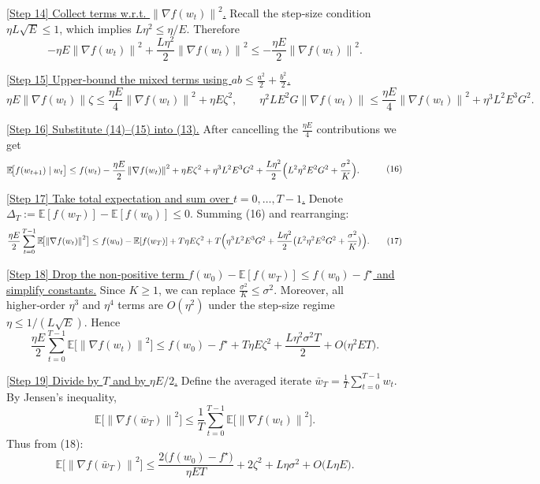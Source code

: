 \documentclass{article}
\newcommand{\E}{\mathbb{E}}
\newcommand{\norm}[1]{\left\|#1\right\|}
\begin{document}
\noindent\underline{[Step 14] Collect terms w.r.t. $\norm{\nabla f(w_t)}^{2}$.}
Recall the step‑size condition $\eta L\sqrt{E}\le 1$, which implies $L\eta^{2}\le \eta/E$. Therefore
\[
-\eta E \norm{\nabla f(w_t)}^{2}+\frac{L\eta^{2}}{2}\norm{\nabla f(w_t)}^{2}
\le -\frac{\eta E}{2}\norm{\nabla f(w_t)}^{2}. \tag{14}
\]

\noindent\underline{[Step 15] Upper‑bound the mixed terms using $ab\le\frac{a^{2}}{2}+ \frac{b^{2}}{2}$.}
\[
\eta E \norm{\nabla f(w_t)}\zeta
   \le \frac{\eta E}{4}\norm{\nabla f(w_t)}^{2}
        +\eta E\zeta^{2},
\qquad
\eta^{2}L E^{2} G\norm{\nabla f(w_t)}
   \le \frac{\eta E}{4}\norm{\nabla f(w_t)}^{2}
        +\eta^{3}L^{2}E^{3}G^{2}. \tag{15}
\]

\noindent\underline{[Step 16] Substitute (14)–(15) into (13).}
After cancelling the $\frac{\eta E}{4}$ contributions we get
\[
\begin{aligned}
\E\!\bigl[f(w_{t+1})\mid w_t\bigr]
&\le f(w_t)
   -\frac{\eta E}{2}\norm{\nabla f(w_t)}^{2}
   +\eta E\zeta^{2}
   +\eta^{3}L^{2}E^{3}G^{2}
   +\frac{L\eta^{2}}{2}\Bigl(L^{2}\eta^{2}E^{2}G^{2}
        +\frac{\sigma^{2}}{K}\Bigr).
\end{aligned}
\tag{16}
\]

\noindent\underline{[Step 17] Take total expectation and sum over $t=0,\dots,T-1$.}
Denote $\Delta_T:=\E[f(w_T)]-\E[f(w_0)]\le 0$.
Summing (16) and rearranging:
\[
\frac{\eta E}{2}\sum_{t=0}^{T-1}\E\!\bigl[\norm{\nabla f(w_t)}^{2}\bigr]
\le f(w_0)-\E[f(w_T)]
   +T\eta E\zeta^{2}
   +T\Bigl(\eta^{3}L^{2}E^{3}G^{2}
          +\frac{L\eta^{2}}{2}\bigl(L^{2}\eta^{2}E^{2}G^{2}
                                   +\frac{\sigma^{2}}{K}\bigr)\Bigr). \tag{17}
\]

\noindent\underline{[Step 18] Drop the non‑positive term $f(w_0)-\E[f(w_T)]\le f(w_0)-f^\star$ and simplify constants.}
Since $K\ge1$, we can replace $\frac{\sigma^{2}}{K}\le\sigma^{2}$. Moreover, all higher‑order $\eta^{3}$ and $\eta^{4}$ terms are $O(\eta^{2})$ under the step‑size regime $\eta\le 1/(L\sqrt{E})$. Hence
\[
\frac{\eta E}{2}\sum_{t=0}^{T-1}\E\!\bigl[\norm{\nabla f(w_t)}^{2}\bigr]
\le f(w_0)-f^\star
   +T\eta E\zeta^{2}
   +\frac{L\eta^{2}\sigma^{2}T}{2}
   +O\!\bigl(\eta^{2}ET\bigr). \tag{18}
\]

\noindent\underline{[Step 19] Divide by $T$ and by $\eta E/2$.}
Define the averaged iterate $\bar w_T=\frac1T\sum_{t=0}^{T-1}w_t$. By Jensen’s inequality,
\[
\E\!\bigl[\norm{\nabla f(\bar w_T)}^{2}\bigr]
\le \frac{1}{T}\sum_{t=0}^{T-1}\E\!\bigl[\norm{\nabla f(w_t)}^{2}\bigr].
\]
Thus from (18):
\[
\E\!\bigl[\norm{\nabla f(\bar w_T)}^{2}\bigr]
\le
\frac{2\bigl(f(w_0)-f^\star\bigr)}{\eta ET}
   +2\zeta^{2}
   +L\eta\sigma^{2}
   +O\!\bigl(L\eta E\bigr). \tag{19}
\]
\end{document}

